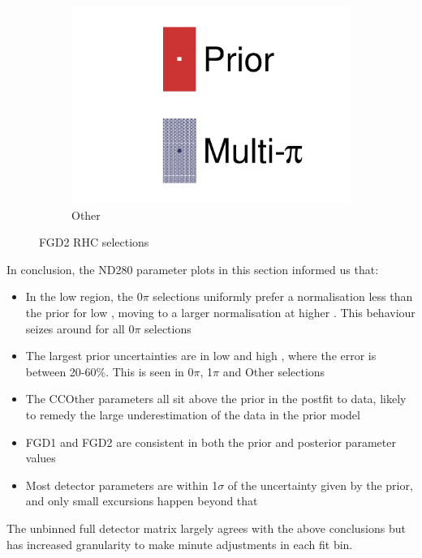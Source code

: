 \begin{figure}[h]
\begin{subfigure}[t]{0.32\textwidth}
		\includegraphics[width=\textwidth,page=57, trim={0mm 0mm 0mm 0mm}, clip]{figures/mach3/2018/data/2018a_FixedCov_RedCov_Mpi_Data_merge_drawPar_withDet}
		\caption{Other}
	\end{subfigure}
	\caption{FGD2 \numu RHC selections}
	\label{fig:data_multipi_det_fdg2_numuRHC}
\end{figure}

In conclusion, the ND280 parameter plots in this section informed us that:
\begin{itemize}
	\item In the low \cosmu region, the 0$\pi$ selections uniformly prefer a normalisation less than the prior for low \pmu, moving to a larger normalisation at higher \pmu. This behaviour seizes around  for all 0$\pi$ selections
	\item The largest prior uncertainties are in low \cosmu and high \pmu, where the error is between 20-60\%. This is seen in 0$\pi$, 1$\pi$ and Other selections
	\item The \numu CCOther parameters all sit above the prior in the postfit to data, likely to remedy the large underestimation of the data in the prior model
	\item FGD1 and FGD2 are consistent in both the prior and posterior parameter values
	\item Most detector parameters are within 1$\sigma$ of the uncertainty given by the prior, and only small excursions happen beyond that
\end{itemize}
The unbinned full detector matrix largely agrees with the above conclusions but has increased granularity to make minute adjustments in each fit bin.


